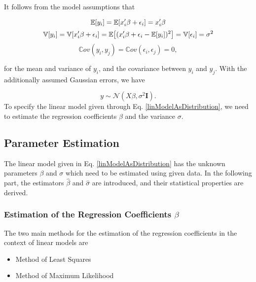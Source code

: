 \documentclass[10pt,a4paper]{article}
\begin{document}
It follows from the model assumptions that 

\begin{equation}
\mathbb E[y_i] = \mathbb E [x_i'\beta + \epsilon_i] = x_i'\beta \\
\end{equation}
\begin{equation}
\mathbb V[y_i] = \mathbb V[x_i'\beta + \epsilon_i] = \mathbb{E}\big[(x_i'\beta + \epsilon_i - \mathbb{E}[y_i])^2\big] = \mathbb V[\epsilon_i] = \sigma^2 \\
\end{equation}
\begin{equation}
\mathbb Cov(y_i, y_j) = \mathbb Cov(\epsilon_i, \epsilon_j) = 0, 
\end{equation}
	
for the mean and variance of $y_i$, and the covariance between $y_i$ and $y_j$. With the additionally assumed Gaussian errors, we have

\begin{equation} \label{linModelAsDistribution}
y \sim \mathcal N(X\beta, \sigma^2\mathbf I).
\end{equation}
To specify the linear model given through Eq. \ref{linModelAsDistribution}, we need to estimate the regression coefficients $\beta$ and the variance $\sigma$.


\subsection{Parameter Estimation}

The linear model given in Eq. \ref{linModelAsDistribution} has the unknown parameters $\beta$ and $\sigma$ which need to be estimated using given data. In the following part, the estimators $\hat \beta$ and $\hat \sigma$ are introduced, and their statistical properties are derived. 

\subsubsection{Estimation of the Regression Coefficients $\beta$}

The two main methods for the estimation of the regression coefficients in the context of linear models are

\begin{itemize}
	\item Method of Least Squares
	\item Method of Maximum Likelihood
\end{itemize}	
\end{document}

